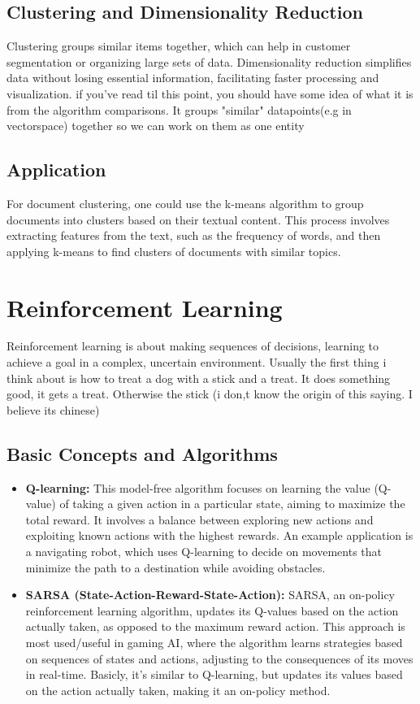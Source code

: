 \documentclass[11pt]{article}
\begin{document}
\subsection{Clustering and Dimensionality Reduction}
Clustering groups similar items together, which can help in customer segmentation or organizing large sets of data. Dimensionality reduction simplifies data without losing essential information, facilitating faster processing and visualization. if you've read til this point, you should have some idea of what it is from the algorithm comparisons. It groups "similar" datapoints(e.g in vectorspace) together so we can work on them as one entity

\subsection{Application}
For document clustering, one could use the k-means algorithm to group documents into clusters based on their textual content. This process involves extracting features from the text, such as the frequency of words, and then applying k-means to find clusters of documents with similar topics.

\section{Reinforcement Learning}
Reinforcement learning is about making sequences of decisions, learning to achieve a goal in a complex, uncertain environment. Usually the first thing i think about is how to treat a dog with a stick and a treat. It does something good, it gets a treat. Otherwise the stick (i don,t know the origin of this saying. I believe its chinese)

\subsection{Basic Concepts and Algorithms}
\begin{itemize}
    \item \textbf{Q-learning:} This model-free algorithm focuses on learning the value (Q-value) of taking a given action in a particular state, aiming to maximize the total reward. It involves a balance between exploring new actions and exploiting known actions with the highest rewards. An example application is a navigating robot, which uses Q-learning to decide on movements that minimize the path to a destination while avoiding obstacles.
    
    \item \textbf{SARSA (State-Action-Reward-State-Action):} SARSA, an on-policy reinforcement learning algorithm, updates its Q-values based on the action actually taken, as opposed to the maximum reward action. This approach is most used/useful in gaming AI, where the algorithm learns strategies based on sequences of states and actions, adjusting to the consequences of its moves in real-time. Basicly, it's similar to Q-learning, but updates its values based on the action actually taken, making it an on-policy method.
    
\end{itemize}
\end{document}
